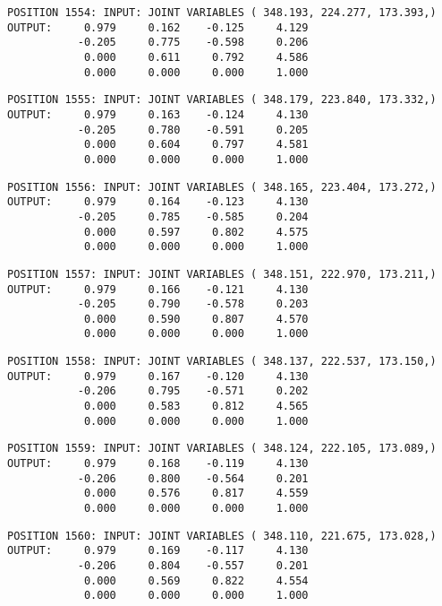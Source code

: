 \begin{verbatim}
POSITION 1554: INPUT: JOINT VARIABLES ( 348.193, 224.277, 173.393,)
OUTPUT:     0.979     0.162    -0.125     4.129
           -0.205     0.775    -0.598     0.206
            0.000     0.611     0.792     4.586
            0.000     0.000     0.000     1.000
\end{verbatim} \pagebreak[1]\begin{verbatim}
POSITION 1555: INPUT: JOINT VARIABLES ( 348.179, 223.840, 173.332,)
OUTPUT:     0.979     0.163    -0.124     4.130
           -0.205     0.780    -0.591     0.205
            0.000     0.604     0.797     4.581
            0.000     0.000     0.000     1.000
\end{verbatim} \pagebreak[1]\begin{verbatim}
POSITION 1556: INPUT: JOINT VARIABLES ( 348.165, 223.404, 173.272,)
OUTPUT:     0.979     0.164    -0.123     4.130
           -0.205     0.785    -0.585     0.204
            0.000     0.597     0.802     4.575
            0.000     0.000     0.000     1.000
\end{verbatim} \pagebreak[1]\begin{verbatim}
POSITION 1557: INPUT: JOINT VARIABLES ( 348.151, 222.970, 173.211,)
OUTPUT:     0.979     0.166    -0.121     4.130
           -0.205     0.790    -0.578     0.203
            0.000     0.590     0.807     4.570
            0.000     0.000     0.000     1.000
\end{verbatim} \pagebreak[1]\begin{verbatim}
POSITION 1558: INPUT: JOINT VARIABLES ( 348.137, 222.537, 173.150,)
OUTPUT:     0.979     0.167    -0.120     4.130
           -0.206     0.795    -0.571     0.202
            0.000     0.583     0.812     4.565
            0.000     0.000     0.000     1.000
\end{verbatim} \pagebreak[1]\begin{verbatim}
POSITION 1559: INPUT: JOINT VARIABLES ( 348.124, 222.105, 173.089,)
OUTPUT:     0.979     0.168    -0.119     4.130
           -0.206     0.800    -0.564     0.201
            0.000     0.576     0.817     4.559
            0.000     0.000     0.000     1.000
\end{verbatim} \pagebreak[1]\begin{verbatim}
POSITION 1560: INPUT: JOINT VARIABLES ( 348.110, 221.675, 173.028,)
OUTPUT:     0.979     0.169    -0.117     4.130
           -0.206     0.804    -0.557     0.201
            0.000     0.569     0.822     4.554
            0.000     0.000     0.000     1.000
\end{verbatim} \pagebreak[1]\begin{verbatim}

\end{verbatim}
